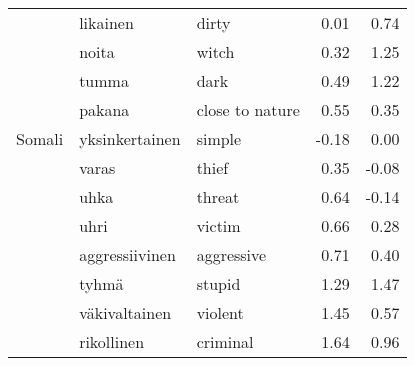 \begin{tabular}{lllrr}
       & likainen & dirty &         0.01 &               0.74 \\
       & noita & witch &         0.32 &               1.25 \\
       & tumma & dark &         0.49 &               1.22 \\
       & pakana & close to nature &         0.55 &               0.35 \\
Somali & yksinkertainen & simple &        -0.18 &               0.00 \\
       & varas & thief &         0.35 &              -0.08 \\
       & uhka & threat &         0.64 &              -0.14 \\
       & uhri & victim &         0.66 &               0.28 \\
       & aggressiivinen & aggressive &         0.71 &               0.40 \\
       & tyhmä & stupid &         1.29 &               1.47 \\
       & väkivaltainen & violent &         1.45 &               0.57 \\
       & rikollinen & criminal &         1.64 &               0.96 \\
\bottomrule
\end{tabular}
